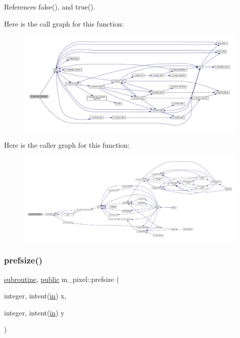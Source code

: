References false(), and true().

Here is the call graph for this function\+:
\nopagebreak
\begin{figure}[H]
\begin{center}
\leavevmode
\includegraphics[width=350pt]{namespacem__pixel_a4924b3a5033acb74a4f4df60a4ba21eb_cgraph}
\end{center}
\end{figure}
Here is the caller graph for this function\+:
\nopagebreak
\begin{figure}[H]
\begin{center}
\leavevmode
\includegraphics[width=350pt]{namespacem__pixel_a4924b3a5033acb74a4f4df60a4ba21eb_icgraph}
\end{center}
\end{figure}
\mbox{\label{namespacem__pixel_acc868686f05b7e0b3cd33bf9d1c6bb98}} 
\subsubsection{\texorpdfstring{prefsize()}{prefsize()}}
{\footnotesize\ttfamily \hyperlink{M__stopwatch_83_8txt_acfbcff50169d691ff02d4a123ed70482}{subroutine}, \hyperlink{M__stopwatch_83_8txt_a2f74811300c361e53b430611a7d1769f}{public} m\+\_\+pixel\+::prefsize (\begin{DoxyParamCaption}\item[{integer, intent(\hyperlink{M__journal_83_8txt_afce72651d1eed785a2132bee863b2f38}{in})}]{x,  }\item[{integer, intent(\hyperlink{M__journal_83_8txt_afce72651d1eed785a2132bee863b2f38}{in})}]{y }\end{DoxyParamCaption})}



